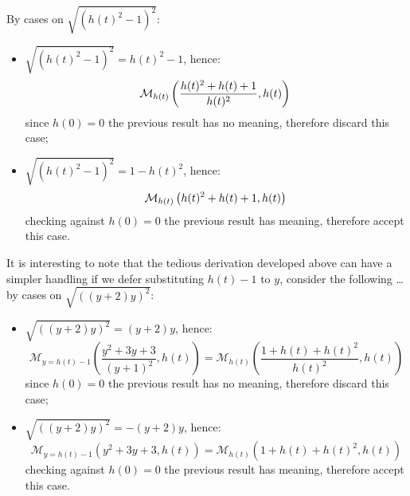 \documentclass[11pt,a4paper]{article} %
\begin{document}
    By cases on $\sqrt{\left(h(t)^2 - 1\right)^{2}}$:
    \begin{itemize}
        \item $\sqrt{\left(h(t)^2 - 1\right)^{2}}= h(t)^2 - 1$, hence:
            \begin{displaymath} 
                \mathcal{M}_{h(t)}\left(\frac{ h(t)^{2} + h(t) + 1}{h(t)^{2}} , h(t) \right)\\
            \end{displaymath} 
            since $h(0)=0$ the previous result has no meaning, therefore discard this case;
        \item $\sqrt{\left(h(t)^2 - 1\right)^{2}}= 1-h(t)^2$, hence:
            \begin{displaymath} 
                \mathcal{M}_{h(t)}\left( h(t)^{2} + h(t) + 1, h(t) \right)\\
            \end{displaymath} 
            checking against $h(0)=0$ the previous result has meaning, therefore accept this case.
    \end{itemize}

    It is interesting to note that the tedious derivation developed above can have
    a simpler handling if we defer substituting $h(t)-1$ to $y$, consider the following \ldots
    by cases on $\sqrt{\left(\left(y + 2\right) y\right)^{2}}$:
    \begin{itemize}
        \item $\sqrt{\left(\left(y + 2\right) y\right)^{2}}=\left(y + 2\right) y$, hence:
            \begin{displaymath} 
                \mathcal{M}_{y=h(t)-1}\left(\frac{y^{2} + 3y + 3}{{\left(y + 1\right)}^{2}} , h(t) \right) = 
                    \mathcal{M}_{h(t)}\left( \frac{1+h(t)+h(t)^2}{h(t)^2}, h(t) \right) 
            \end{displaymath} 
            since $h(0)=0$ the previous result has no meaning, therefore discard this case;
        \item $\sqrt{\left(\left(y + 2\right) y\right)^{2}}=-\left(y + 2\right) y$, hence:
            \begin{displaymath} 
                \mathcal{M}_{y=h(t)-1}\left(y^{2} + 3y + 3 , h(t) \right) = 
                    \mathcal{M}_{h(t)}\left( 1+h(t)+h(t)^2, h(t) \right) 
            \end{displaymath} 
            checking against $h(0)=0$ the previous result has meaning, therefore accept this case.
    \end{itemize}
\end{document}

